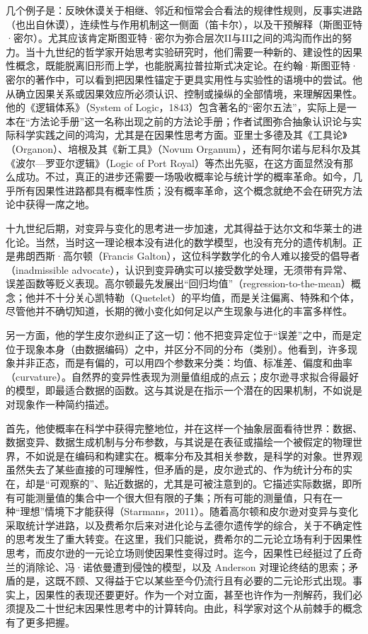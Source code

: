 几个例子是：反映休谟关于相继、邻近和恒常会合看法的规律性规则，反事实进路（也出自休谟），连续性与作用机制这一侧面（笛卡尔），以及干预解释（斯图亚特·密尔）。尤其应该肯定斯图亚特·密尔为弥合层次II与III之间的鸿沟而作出的努力。当十九世纪的哲学家开始思考实验研究时，他们需要一种新的、建设性的因果性概念，既能脱离旧形而上学，也能脱离拉普拉斯式决定论。在约翰·斯图亚特·密尔的著作中，可以看到把因果性锚定于更具实用性与实验性的语境中的尝试。他从确立因果关系或因果效应所必须认识、控制或操纵的全部情境，来理解因果性。他的《逻辑体系》（System of Logic，1843）包含著名的“密尔五法”，实际上是一本在“方法论手册”这一名称出现之前的方法论手册；作者试图弥合抽象认识论与实际科学实践之间的鸿沟，尤其是在因果性思考方面。亚里士多德及其《工具论》（Organon）、培根及其《新工具》（Novum Organum），还有阿尔诺与尼科尔及其《波尔—罗亚尔逻辑》（Logic of Port Royal）等杰出先驱，在这方面显然没有那么成功。不过，真正的进步还需要一场吸收概率论与统计学的概率革命。如今，几乎所有因果性进路都具有概率性质；没有概率革命，这个概念就绝不会在研究方法论中获得一席之地。

十九世纪后期，对变异与变化的思考进一步加速，尤其得益于达尔文和华莱士的进化论。当然，当时这一理论根本没有进化的数学模型，也没有充分的遗传机制。正是弗朗西斯·高尔顿（Francis Galton），这位科学数学化的令人难以接受的倡导者（inadmissible advocate），认识到变异确实可以接受数学处理，无须带有异常、误差函数等贬义表现。高尔顿最先发展出“回归均值”（regression-to-the-mean）概念；他并不十分关心凯特勒（Quetelet）的平均值，而是关注偏离、特殊和个体，尽管他并不确切知道，长期的微小变化如何足以产生现象与进化的丰富多样性。

另一方面，他的学生皮尔逊纠正了这一切：他不把变异定位于“误差”之中，而是定位于现象本身（由数据编码）之中，并区分不同的分布（类别）。他看到，许多现象并非正态，而是有偏的，可以用四个参数来分类：均值、标准差、偏度和曲率（curvature）。自然界的变异性表现为测量值组成的点云；皮尔逊寻求拟合得最好的模型，即最适合数据的函数。这与其说是在指示一个潜在的因果机制，不如说是对现象作一种简约描述。

首先，他使概率在科学中获得完整地位，并在这样一个抽象层面看待世界：数据、数据变异、数据生成机制与分布参数，与其说是在表征或描绘一个被假定的物理世界，不如说是在编码和构建实在。概率分布及其相关参数，是科学的对象。世界观虽然失去了某些直接的可理解性，但矛盾的是，皮尔逊式的、作为统计分布的实在，却是“可观察的”、贴近数据的，尤其是可被注意到的。它描述实际数据，即所有可能测量值的集合中一个很大但有限的子集；所有可能的测量值，只有在一种“理想”情境下才能获得（Starmans，2011）。随着高尔顿和皮尔逊对变异与变化采取统计学进路，以及费希尔后来对进化论与孟德尔遗传学的综合，关于不确定性的思考发生了重大转变。在这里，我们只能说，费希尔的二元论立场有利于因果性思考，而皮尔逊的一元论立场则使因果性变得过时。迄今，因果性已经挺过了丘奇兰的消除论、冯·诺依曼遭到侵蚀的模型，以及 Anderson 对理论终结的思索；矛盾的是，这既不顾、又得益于它以某些至今仍流行且有必要的二元论形式出现。事实上，因果性的表现还要更好。作为一个对立面，甚至也许作为一剂解药，我们必须提及二十世纪末因果性思考中的计算转向。由此，科学家对这个从前棘手的概念有了更多把握。

